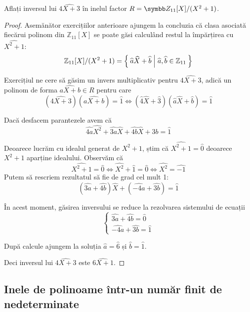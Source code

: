 \begin{exercise}[2.8]
Aflați inversul lui \(\widehat{4X + 3}\) în inelul factor \newline \(R = \integersmod{11}[X] / (X^2 + 1)\).
\end{exercise}
\begin{proof}
Asemănător exercițiilor anterioare ajungem la concluzia că clasa asociată fiecărui polinom din \(\mathbb{Z}_{11}[X]\) se poate găsi calculând restul la împărțirea cu \(\widehat{X^2 + 1}\):
\[
\mathbb{Z}_{11}[X] / (X^2 + 1) = \Set{ \widehat{a}\widehat{X} + \widehat{b} | \widehat{a}, \widehat{b} \in \mathbb{Z}_{11} }
\]

Exercițiul ne cere să găsim un invers multiplicativ pentru \(\widehat{4X + 3}\), adică un polinom de forma \(\widehat{aX + b} \in R\) pentru care
\[
(\widehat{4X + 3})(\widehat{aX + b}) = \widehat{1}
\iff
(\widehat{4}\widehat{X} + \widehat{3})(\widehat{a}\widehat{X} + \widehat{b}) = \widehat{1}
\]

Dacă desfacem parantezele avem că
\[
\widehat{4a}\widehat{X^2} + \widehat{3a}\widehat{X} + \widehat{4b}\widehat{X} + \widehat{3b} = \widehat{1}
\]

Deoarece lucrăm cu idealul generat de \(X^2 + 1\), știm că \(\widehat{X^2 + 1} = \widehat{0}\) deoarece \(X^2 + 1\) aparține idealului. Observăm că
\[
\widehat{X^2 + 1} = \widehat{0} \iff \widehat{X^2} + \widehat{1} = \widehat{0} \iff \widehat{X^2} = \widehat{-1}
\]
Putem să rescriem rezultatul să fie de grad cel mult 1:
\[
(\widehat{3a} + \widehat{4b})\widehat{X} + (\widehat{-4a} + \widehat{3b}) = \widehat{1}
\]

În acest moment, găsirea inversului se reduce la rezolvarea sistemului de ecuații
\[
\begin{cases}
    \widehat{3a} + \widehat{4b} = \widehat{0} \\
    \widehat{-4a} + \widehat{3b} = \widehat{1}
\end{cases}
\]

După calcule ajungem la soluția \(\widehat{a} = \widehat{6}\) și \(\widehat{b} = \widehat{1}\).

Deci inversul lui \(\widehat{4X + 3}\) este \(\widehat{6X + 1}\).
\end{proof}

\subsection{Inele de polinoame într-un număr finit de nedeterminate}

